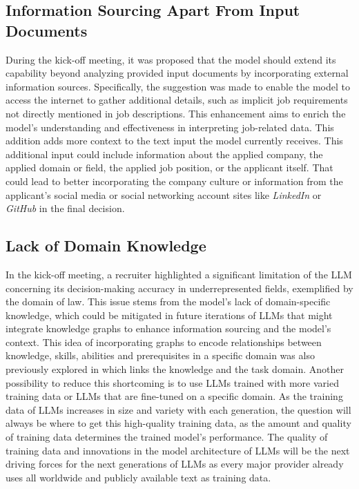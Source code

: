 \documentclass[draft,final]{thesisclass} %
\begin{document}
\subsection{Information Sourcing Apart From Input Documents} \label{interpretation_sourcing_from_internet}
During the kick-off meeting, it was proposed that the model should extend its capability beyond analyzing provided input documents by incorporating external information sources. Specifically, the suggestion was made to enable the model to access the internet to gather additional details, such as implicit job requirements not directly mentioned in job descriptions. This enhancement aims to enrich the model's understanding and effectiveness in interpreting job-related data. This addition adds more context to the text input the model currently receives. This additional input could include information about the applied company, the applied domain or field, the applied job position, or the applicant itself. That could lead to better incorporating the company culture or information from the applicant's social media or social networking account sites like \textit{LinkedIn} or \textit{GitHub} in the final decision.

\subsection{Lack of Domain Knowledge}
In the kick-off meeting, a recruiter highlighted a significant limitation of the \gls{LLM} concerning its decision-making accuracy in underrepresented fields, exemplified by the domain of law. This issue stems from the model's lack of domain-specific knowledge, which could be mitigated in future iterations of \gls{LLM}s that might integrate knowledge graphs to enhance information sourcing and the model's context. This idea of incorporating graphs to encode relationships between knowledge, skills, abilities and prerequisites in a specific domain was also previously explored in \textcite{ontology_approach_job_knowledge} which links the knowledge and the task domain. Another possibility to reduce this shortcoming is to use \gls{LLM}s trained with more varied training data or \gls{LLM}s that are fine-tuned on a specific domain. As the training data of \gls{LLM}s increases in size and variety with each generation, the question will always be where to get this high-quality training data, as the amount and quality of training data determines the trained model's performance. The quality of training data and innovations in the model architecture of \gls{LLM}s will be the next driving forces for the next generations of \gls{LLM}s as every major provider already uses all worldwide and publicly available text as training data.
\end{document}
